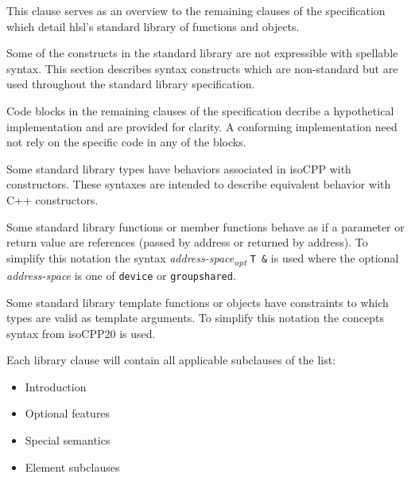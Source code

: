 
\p This clause serves as an overview to the remaining clauses of the
specification which detail \acrshort{hlsl}'s standard library of functions and
objects.


\p Some of the constructs in the standard library are not expressible with
spellable syntax. This section describes syntax constructs which are
non-standard but are used throughout the standard library specification.

\p Code blocks in the remaining clauses of the specification decribe a
hypothetical implementation and are provided for clarity. A conforming
implementation need not rely on the specific code in any of the blocks.


\p Some standard library types have behaviors associated in \gls{isoCPP} with
constructors. These syntaxes are intended to describe equivalent behavior with
C++ constructors.


\p Some standard library functions or member functions behave as if a parameter
or return value are references (passed by address or returned by address). To
simplify this notation the syntax \textit{address-space\textsubscript{opt}}
\texttt{T \&} is used where the optional \textit{address-space} is one of
\texttt{device} or \texttt{groupshared}.


\p Some standard library template functions or objects have constraints to which
types are valid as template arguments. To simplify this notation the concepts
syntax from \gls{isoCPP20} is used.



\p Each library clause will contain all applicable subclauses of the list:

\begin{itemize}
  \item Introduction
  \item Optional features
  \item Special semantics
  \item Element subclauses
\end{itemize}

